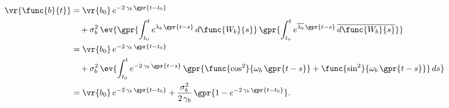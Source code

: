 \begin{align}
    \vr{\func{b}{t}} &= \vr{b_0}\,e^{-2\,\gamma_{b}\,\gpr{t - t_0}} \nonumber \\
    		&\quad + \sigma_b^{2}\,\ev{\gpr{\int_{t_0}^{t} e^{\lambda_b\,\gpr{t - s}}\,d\func{W_b}{s}}\,\gpr{\int_{t_0}^{t} e^{\overline{\lambda_b}\,\gpr{t - s}}\,\overline{d\func{W_b}{s}}}} \nonumber \\
    	&= \vr{b_0}\,e^{-2\,\gamma_{b}\,\gpr{t - t_0}} \nonumber \\
    		&\quad + \sigma_b^2\,\ev{\int_{t_0}^{t} e^{-2\,\gamma_{b}\,\gpr{t-s}}\,\gpr{\func{\cos^2}{\omega_{b}\,\gpr{t-s}} + \func{\sin^2}{\omega_{b}\,\gpr{t-s}}} \,ds} \nonumber \\
    	&= \vr{b_0}\,e^{-2\,\gamma_{b}\,\gpr{t - t_0}} + \frac{\sigma_b^2}{2\,\gamma_{b}}\,\gpr{1 - e^{-2\,\gamma_{b}\,\gpr{t - t_0}}}. \label{eqn:var_b}
\end{align}

